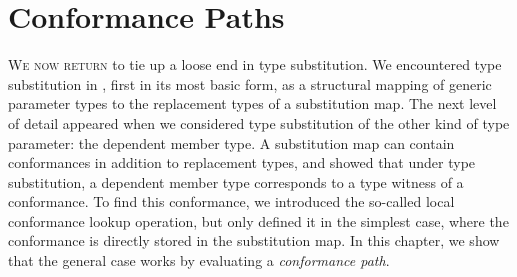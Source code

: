 \documentclass[../generics]{subfiles}
\begin{document}
\newcommand{\NormalConformance}[4]{
\begin{tabular}{|lcl|}
\hline
\multicolumn{3}{|l|}{\texttt{#1:\ #2}}\\
\hline
\rule{0pt}{3ex}\textbf{Associated type}&&\textbf{Type witness}\\
#3\\[\medskipamount]
\textbf{Conformance requirement}&&\textbf{Conformance}\\
#4\\[\medskipamount]
\hline
\end{tabular}
}
\newcommand{\AssocTypeDef}[2]{$\AssocType{#1}$&$\mapsto$&\texttt{#2}}
\newcommand{\AssocConfDef}[3]{$\AssocConf{#1}{#3}$&$\mapsto$&\ConfReq{#2}{#3}}

\chapter{Conformance Paths}\label{conformance paths}

\lettrine{W}{e now return} to tie up a loose end in type substitution. We encountered type substitution in , first in its most basic form, as a structural mapping of generic parameter types to the replacement types of a substitution map. The next level of detail appeared when we considered type substitution of the other kind of type parameter: the dependent member type. A substitution map can contain conformances in addition to replacement types, and  showed that under type substitution, a dependent member type corresponds to a type witness of a conformance. To find this conformance, we introduced the so-called local conformance lookup operation, but only defined it in the simplest case, where the conformance is directly stored in the substitution map. In this chapter, we show that the general case works by evaluating a \emph{conformance path}.
\end{document}
